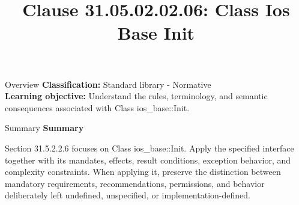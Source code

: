 \documentclass[10pt,letterpaper]{article}
\title{Clause 31.05.02.02.06: Class Ios Base Init}
\author{}
\date{}
\begin{document}
\maketitle
\begin{CornellOverviewBox}{Overview}
\textbf{Classification:} Standard library - Normative\\[2pt]
\textbf{Learning objective:} Understand the rules, terminology, and semantic consequences associated with Class ios\_base::Init.
\end{CornellOverviewBox}\begin{CornellSummaryBox}{Summary}
{\sffamily\bfseries\color{Accent} Summary}\par\vspace{3pt}Section 31.5.2.2.6 focuses on Class ios\_base::Init. Apply the specified interface together with its mandates, effects, result conditions, exception behavior, and complexity constraints. When applying it, preserve the distinction between mandatory requirements, recommendations, permissions, and behavior deliberately left undefined, unspecified, or implementation-defined.
\end{CornellSummaryBox}
\end{document}
